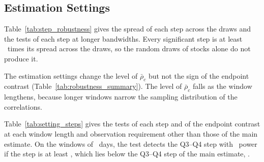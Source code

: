 \documentclass[a4paper,fleqn]{cas-sc}
\begin{document}
\subsection{Estimation Settings}\label{subsec:researcher_choices}

Table~\ref{tab:step_robustness} gives the spread of each step across the draws and the tests of each step at longer bandwidths. Every significant step is at least \stepDrawSpreadRatioMin\ times its spread across the draws, so the random draws of stocks alone do not produce it.

The estimation settings change the level of $\bar\rho_c$ but not the sign of the endpoint contrast (Table~\ref{tab:robustness_summary}). The level of $\bar\rho_c$ falls as the window lengthens, because longer windows narrow the sampling distribution of the correlations.

Table~\ref{tab:setting_steps} gives the tests of each step and of the endpoint contrast at each window length and observation requirement other than those of the main estimate. On the windows of \windowDaysWthirty\ days, the test detects the Q3--Q4 step with \detectPowerPct\ power if the step is at least \detectWthirtyQthreeQfour, which lies below the Q3--Q4 step of the main estimate, \rhoCStepHeadlineQthreeQfour.
\end{document}
